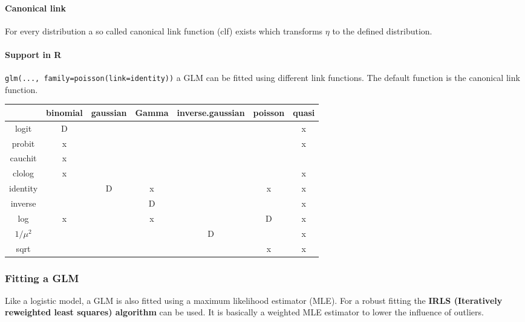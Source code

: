 \paragraph{Canonical link}
For every distribution a so called canonical link function (clf) exists which transforms $\eta$ to the defined distribution.

\paragraph{Support in R}
\lstinline{glm(..., family=poisson(link=identity))} a GLM can be fitted using different link functions. The default function is the canonical link function.

\begin{tabular}{c|cccccc}
	& binomial & gaussian & Gamma & inverse.gaussian & poisson & quasi \\
	\hline 
	logit & D & & & & & x \\
	probit & x & & & & & x \\
	cauchit & x & & & & &  \\
	clolog & x & & & & & x \\
	identity & & D & x & & x & x \\
	inverse & & & D & & & x \\
	log & x & & x & & D & x \\
	$1/\mu^2$ & & & & D & & x \\
	sqrt & & & & & x & x \\
\end{tabular}

\subsubsection{Fitting a GLM}

Like a logistic model, a GLM is also fitted using a maximum likelihood estimator (MLE). For a robust fitting the \textbf{IRLS (Iteratively reweighted least squares) algorithm} can be used. It is basically a weighted MLE estimator to lower the influence of outliers.
